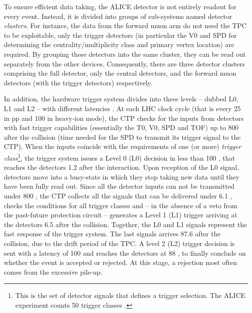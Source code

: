 To ensure efficient data taking, the ALICE detector is not entirely readout for every event. Instead, it is divided into groups of sub-systems named detector \textit{clusters}. For instance, the data from the forward muon arm do not need the TPC to be exploitable, only the trigger detectors (in particular the V0 and SPD for determining the centrality/multiplicity class and primary vertex location) are required. By grouping these detectors into the same cluster, they can be read out separately from the other devices. Consequently, there are three detector clusters comprising the full detector, only the central detectors, and the forward muon detectors (with the trigger detectors) respectively.

In addition, the hardware trigger system divides into three levels -- dubbed L0, L1 and L2 -- with different latencies \cite{bloodworthALICECentralTrigger2000}\cite{alicecollaborationTriggerDataAcquisition}. At each LHC clock cycle (that is every 25 \nsec in pp and 100 \nsec in heavy-ion mode), the CTP checks for the inputs from detectors with fast trigger capabilities (essentially the T0, V0, SPD and TOF) up to 800 \nsec after the collision (time needed for the SPD to transmit its trigger signal to the CTP). When the inputs coincide with the requirements of one (or more) \textit{trigger class}\footnote{This is the set of detector signals that defines a trigger selection. The ALICE experiment counts 50 trigger classes \cite{alicecollaborationALICEExperimentCERN2008}.}, the trigger system issues a Level 0 (L0) decision in less than 100 \nsec, that reaches the detectors 1.2 \musec after the interaction. Upon reception of the L0 signal, detectors move into a busy-state in which they stop taking new data until they have been fully read out. Since all the detector inputs can not be transmitted under 800 \nsec, the CTP collects all the signals that can be delivered under 6.1 \musec, checks the conditions for all trigger classes and -- in the absence of a veto from the past-future protection circuit -- generates a Level 1 (L1) trigger arriving at the detectors 6.5 \musec after the collision. Together, the L0 and L1 signals represent the fast response of the trigger system. The last signals arrives 87.6 \musec after the collision, due to the drift period of the TPC. A level 2 (L2) trigger decision is sent with a latency of 100 \nsec and reaches the detectors at 88 \musec, to finally conclude on whether the event is accepted or rejected. At this stage, a rejection most often comes from the excessive pile-up.\\

